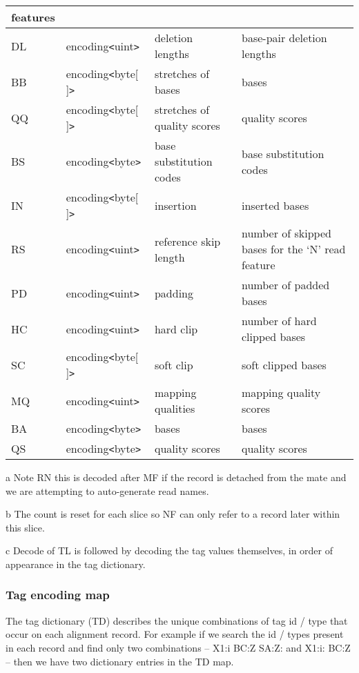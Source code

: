 \documentclass[a4paper]{article}
\begin{document}
\begin{threeparttable}[t]
\begin{tabular}{|l|l|>{\raggedright}p{100pt}|>{\raggedright}p{220pt}|}
features\tabularnewline
\hline
DL & encoding\texttt{<}uint\texttt{>} & deletion lengths & base-pair deletion lengths\tabularnewline
\hline
BB & encoding\texttt{<}byte[ ]\texttt{>} & stretches of bases & bases\tabularnewline
\hline
QQ & encoding\texttt{<}byte[ ]\texttt{>} & stretches of quality scores & quality scores\tabularnewline
\hline
BS & encoding\texttt{<}byte\texttt{>} & base substitution codes & base substitution
codes\tabularnewline
\hline
IN & encoding\texttt{<}byte[ ]\texttt{>} & insertion & inserted bases\tabularnewline
\hline
RS & encoding\texttt{<}uint\texttt{>} & reference skip length & number of skipped 
bases for the `N' read feature\tabularnewline
\hline
PD & encoding\texttt{<}uint\texttt{>} & padding & number of padded bases\tabularnewline
\hline
HC & encoding\texttt{<}uint\texttt{>} & hard clip & number of hard clipped bases\tabularnewline
\hline
SC & encoding\texttt{<}byte[ ]\texttt{>} & soft clip & soft clipped bases\tabularnewline
\hline
MQ & encoding\texttt{<}uint\texttt{>} & mapping qualities & mapping quality scores\tabularnewline
\hline
BA & encoding\texttt{<}byte\texttt{>} & bases & bases\tabularnewline
\hline
QS & encoding\texttt{<}byte\texttt{>} & quality scores & quality scores\tabularnewline
\hline
\end{tabular}

\begin{tablenotes}
\item[a] Note RN this is decoded after MF if the record is detached from the mate and we are attempting to auto-generate read names.
\item[b] The count is reset for each slice so NF can only refer to a record later within this slice.
\item[c] Decode of TL is followed by decoding the tag values themselves, in order of appearance in the tag dictionary.
\end{tablenotes}
\end{threeparttable}

\subsubsection*{Tag encoding map}
\label{subsubsec:tags}

The tag dictionary (TD) describes the unique combinations of tag id / type that occur on each alignment record.
For example if we search the id / types present in each record and find only two combinations -- X1:i BC:Z SA:Z: and X1:i: BC:Z -- then we have two dictionary entries in the TD map.
\end{document}

